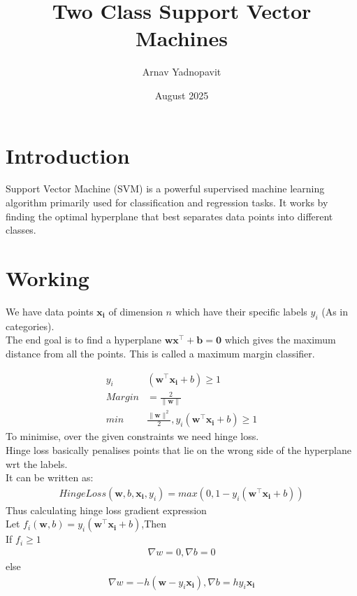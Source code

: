 \documentclass{article}
\title{Two Class Support Vector Machines}
\author{Arnav Yadnopavit}
\date{August 2025}
\newcommand{\norm}[1]{\lVert #1 \rVert}
\renewcommand{\vec}[1]{\bm{#1}}
\begin{document}
\maketitle

\section{Introduction}
Support Vector Machine (SVM) is a powerful supervised machine learning algorithm primarily used for classification and regression tasks. It works by finding the optimal hyperplane that best separates data points into different classes.


\section{Working}
We have data points $\vec{x_i}$ of dimension $n$ which have their specific labels $y_i$ (As in categories).\\

The end goal is to find a hyperplane $\vec{wx^\top+b=0}$ which gives the maximum distance from all the points. This is called a maximum margin classifier.

\begin{align*}
    y_i&(\vec{w}^\top \vec{x_i} +b)\ge 1\\
    Margin&=\frac{2}{\norm{\vec{w}}}\\
    min&\frac{\norm{\vec{w}}^2}{2} , y_i(\vec{w}^\top\vec{x_i}+b)\ge 1
\end{align*}
To minimise, over the given constraints we need hinge loss.\\
Hinge loss basically penalises points that lie on the wrong side of the hyperplane wrt the labels.\\
It can be written as:
\begin{align*}
    HingeLoss(\vec{w},b,\vec{x_i},y_i)=max(0,1-y_i(\vec{w}^\top\vec{x_i}+b))
\end{align*}
Thus calculating hinge loss gradient expression\\
Let $f_i(\vec{w},b)=y_i(\vec{w}^\top\vec{x_i}+b)$,Then\\
If $f_i\ge1$
\begin{align*}
    \nabla w=0, \nabla b=0
\end{align*}
else
\begin{align*}
    \nabla w=-h(\vec{w}-y_i\vec{x_i}), \nabla b=hy_i\vec{x_i}
\end{align*}
\end{document}
